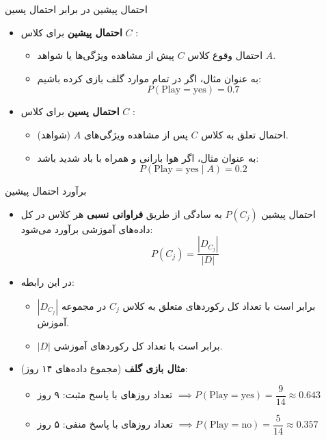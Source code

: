 \begin{frame}{احتمال پیشین در برابر احتمال پسین}{}
  \begin{itemize}
    \setlength{\itemsep}{10pt}
    \item \textbf{\textcolor{mannheimteal}{احتمال پیشین}} برای کلاس $C$ :
    \begin{itemize}
      \setlength{\itemsep}{4pt}
      \item احتمال وقوع کلاس $C$ پیش از مشاهده ویژگی‌ها یا شواهد $A$.
      \item به عنوان مثال، اگر در  تمام موارد گلف بازی کرده باشیم:
      \[
        P(\text{Play}=\text{yes}) = 0.7
      \]
    \end{itemize}
    \item \textbf{\textcolor{mannheimblue}{احتمال پسین}} برای کلاس $C$ :
    \begin{itemize}
      \setlength{\itemsep}{4pt}
      \item احتمال تعلق به کلاس $C$ پس از مشاهده ویژگی‌های $A$ (شواهد).
      \item به عنوان مثال، اگر هوا بارانی و همراه با باد شدید باشد:
      \[
        P(\text{Play}=\text{yes} \mid A) = 0.2
      \]
    \end{itemize}
  \end{itemize}
\end{frame}

\begin{frame}{برآورد احتمال پیشین}{}
  \begin{itemize}
    \setlength{\itemsep}{10pt}
    \item احتمال پیشین $P(C_j)$ به سادگی از طریق \textbf{فراوانی نسبی} هر کلاس در کل داده‌های آموزشی برآورد می‌شود:
    \[
      P(C_j) = \frac{|D_{C_j}|}{|D|}
    \]
    \item در این رابطه:
    \begin{itemize}
      \setlength{\itemsep}{4pt}
      \item $|D_{C_j}|$ برابر است با تعداد کل رکوردهای متعلق به کلاس $C_j$ در مجموعه آموزش.
      \item $|D|$ برابر است با تعداد کل رکوردهای آموزشی.
    \end{itemize}
    \item \textbf{مثال بازی گلف} (مجموع داده‌های ۱۴ روز):
    \begin{itemize}
      \item تعداد روزهای با پاسخ مثبت: ۹ روز $\implies P(\text{Play}=\text{yes}) = \dfrac{9}{14} \approx 0.643$
      \item تعداد روزهای با پاسخ منفی: ۵ روز $\implies P(\text{Play}=\text{no}) = \dfrac{5}{14} \approx 0.357$
    \end{itemize}
  \end{itemize}
\end{frame}

